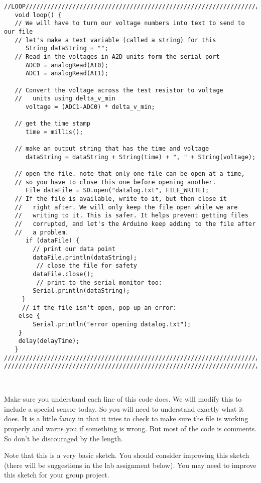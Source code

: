 \begin{verbatim}
//LOOP/////////////////////////////////////////////////////////////////////////
   void loop() {
   // We will have to turn our voltage numbers into text to send to our file
   // let's make a text variable (called a string) for this
      String dataString = ""; 
   // Read in the voltages in A2D units form the serial port
      ADC0 = analogRead(AI0); 
      ADC1 = analogRead(AI1);
 
   // Convert the voltage across the test resistor to voltage 
   //   units using delta_v_min
      voltage = (ADC1-ADC0) * delta_v_min;
 
   // get the time stamp
      time = millis();
 
   // make an output string that has the time and voltage
      dataString = dataString + String(time) + ", " + String(voltage);
     
   // open the file. note that only one file can be open at a time,
   // so you have to close this one before opening another.
      File dataFile = SD.open("datalog.txt", FILE_WRITE);
   // If the file is available, write to it, but then close it 
   //   right after. We will only keep the file open while we are 
   //   writing to it. This is safer. It helps prevent getting files 
   //   corrupted, and let's the Arduino keep adding to the file after 
   //   a problem.
      if (dataFile) {
        // print our data point
        dataFile.println(dataString);
         // close the file for safety
        dataFile.close();
         // print to the serial monitor too:
        Serial.println(dataString);
     }
     // if the file isn't open, pop up an error:
    else {
        Serial.println("error opening datalog.txt");
    }
    delay(delayTime);
   }
//////////////////////////////////////////////////////////////////////////////////////////
//////////////////////////////////////////////////////////////////////////////////////////   
 
 
\end{verbatim}

Make sure you understand each line of this code does. We will modify this to include a special sensor today. So you will need to understand exactly what it does. It is a little fancy in that it tries to check to make sure the file is working properly and warns you if something is wrong. But most of the code is comments. So don't be discouraged by the length.

Note that this is a very basic sketch. You should consider improving this sketch (there will be suggestions in the lab assignment below). You may need to improve this sketch for your group project.


